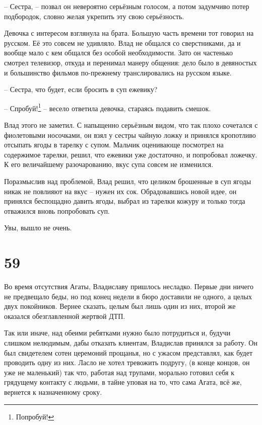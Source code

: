 \documentclass[
  a5paperpaper,
  DIV=11,
  numbers=noendperiod]{scrreprt}
\begin{document}
-- Сестра, -- позвал он невероятно серьёзным голосом, а потом задумчиво
потер подбородок, словно желая укрепить эту свою серьёзность.

Девочка с интересом взглянула на брата. Большую часть времени тот
говорил на русском. Её это совсем не удивляло. Влад не общался со
сверстниками, да и вообще мало с кем общался без особой необходимости.
Зато он частенько смотрел телевизор, откуда и перенимал манеру общения:
дело было в девяностых и большинство фильмов по-прежнему транслировались
на русском языке.

-- Сестра, что будет, если бросить в суп ежевику?

-- Спробуй!\footnote{Попробуй!} -- весело ответила девочка, стараясь
подавить смешок.

Влад этого не заметил. С напыщенно серьёзным видом, что так плохо
сочетался с фиолетовыми носочками, он взял у сестры чайную ложку и
принялся кропотливо отсыпать ягоды в тарелку с супом. Мальчик оценивающе
посмотрел на содержимое тарелки, решил, что ежевики уже достаточно, и
попробовал ложечку. К его величайшему разочарованию, вкус супа совсем не
изменился.

Поразмыслив над проблемой, Влад решил, что целиком брошенные в суп ягоды
никак не повлияют на вкус -- нужен их сок. Обрадовавшись новой идее, он
принялся беспощадно давить ягоды, выбрал из тарелки кожуру и только
тогда отважился вновь попробовать суп.

Увы, вышло не очень.

\section*{59}\label{59}


Во время отсутствия Агаты, Владиславу пришлось несладко. Первые дни
ничего не предвещало беды, но под конец недели в бюро доставили не
одного, а целых двух покойников. Вернее сказать, целым был лишь один из
них, второй же оказался обезглавленной жертвой ДТП.

Так или иначе, над обеими ребятками нужно было потрудиться и, будучи
слишком нелюдимым, дабы отказать клиентам, Владислав принялся за работу.
Он был свидетелем сотен церемоний прощанья, но с ужасом представлял, как
будет проводить одну из них. Ласло не хотел тревожить подругу, (в конце
концов, он уже не маленький) так что, работая над трупами, морально
готовил себя к грядущему контакту с людьми, в тайне уповая на то, что
сама Агата, всё же, вернется к назначенному сроку.
\end{document}
